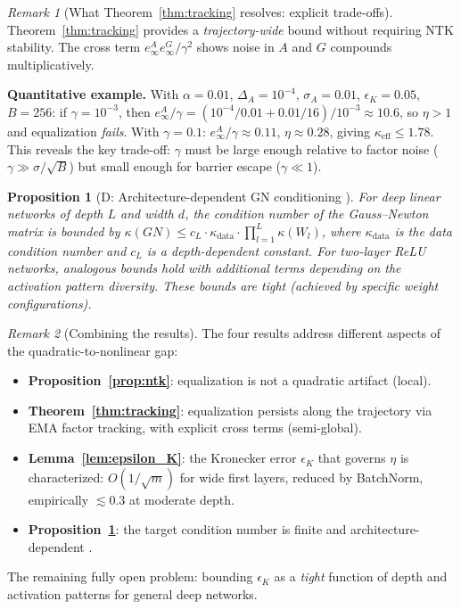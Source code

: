 \documentclass{article}
\theoremstyle{plain}
\newtheorem{proposition}{Proposition}
\theoremstyle{definition}
\theoremstyle{remark}
\newtheorem{remark}{Remark}
\begin{document}
\begin{remark}[What Theorem~\ref{thm:tracking} resolves: explicit trade-offs]
\label{rem:tracking_scope}
Theorem~\ref{thm:tracking} provides a \emph{trajectory-wide} bound without requiring NTK stability. The cross term $e_\infty^A e_\infty^G/\gamma^2$ shows noise in $A$ and $G$ compounds multiplicatively.

\textbf{Quantitative example.} With $\alpha = 0.01$, $\Delta_A = 10^{-4}$, $\sigma_A = 0.01$, $\epsilon_K = 0.05$, $B = 256$: if $\gamma = 10^{-3}$, then $e_\infty^A/\gamma = (10^{-4}/0.01 + 0.01/16)/10^{-3} \approx 10.6$, so $\eta > 1$ and equalization \emph{fails}. With $\gamma = 0.1$: $e_\infty^A/\gamma \approx 0.11$, $\eta \approx 0.28$, giving $\kappa_{\mathrm{eff}} \leq 1.78$. This reveals the key trade-off: $\gamma$ must be large enough relative to factor noise ($\gamma \gg \sigma/\sqrt{B}$) but small enough for barrier escape ($\gamma \ll 1$).
\end{remark}

\begin{proposition}[D: Architecture-dependent GN conditioning \citep{zhao2024gn}]
\label{prop:gn}
For deep linear networks of depth $L$ and width $d$, the condition number of the Gauss--Newton matrix is bounded by $\kappa(GN) \leq c_L \cdot \kappa_{\mathrm{data}} \cdot \prod_{l=1}^L \kappa(W_l)$, where $\kappa_{\mathrm{data}}$ is the data condition number and $c_L$ is a depth-dependent constant. For two-layer ReLU networks, analogous bounds hold with additional terms depending on the activation pattern diversity. These bounds are tight (achieved by specific weight configurations).
\end{proposition}

\begin{remark}[Combining the results]
The four results address different aspects of the quadratic-to-nonlinear gap:
\begin{itemize}
    \item \textbf{Proposition~\ref{prop:ntk}}: equalization is not a quadratic artifact (local).
    \item \textbf{Theorem~\ref{thm:tracking}}: equalization persists along the trajectory via EMA factor tracking, with explicit cross terms (semi-global).
    \item \textbf{Lemma~\ref{lem:epsilon_K}}: the Kronecker error $\epsilon_K$ that governs $\eta$ is characterized: $O(1/\sqrt{m})$ for wide first layers, reduced by BatchNorm, empirically $\lesssim 0.3$ at moderate depth.
    \item \textbf{Proposition~\ref{prop:gn}}: the target condition number is finite and architecture-dependent \citep{zhao2024gn}.
\end{itemize}
The remaining fully open problem: bounding $\epsilon_K$ as a \emph{tight} function of depth and activation patterns for general deep networks.
\end{remark}
\end{document}
